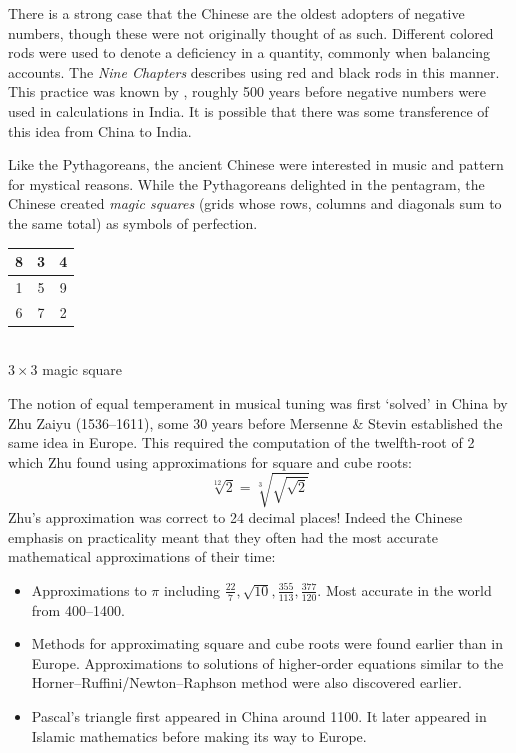 
There is a strong case that the Chinese are the oldest adopters of negative numbers, though these were not originally thought of as such. Different colored rods were used to denote a deficiency in a quantity, commonly  when balancing accounts. The \emph{Nine Chapters} describes using red and black rods in this manner. This practice was known by , roughly 500 years before negative numbers were used in calculations in India. It is possible that there was some transference of this idea from China to India.
\smallskip


\begin{minipage}[t]{0.78\linewidth}\vspace{0pt}
	 Like the Pythagoreans, the ancient Chinese were interested in music and pattern for mystical reasons. While the Pythagoreans delighted in the pentagram, the Chinese created \emph{magic squares} (grids whose rows, columns and diagonals sum to the same total) as symbols of perfection.
\end{minipage}
\hfill
\begin{minipage}[t]{0.2\linewidth}\vspace{0pt}
	\centering
	\begin{tabular}{|c|c|c|}
		\hline
		8&3&4\\\hline
		1&5&9\\\hline
		6&7&2\\\hline
	\end{tabular}
	\\[5pt]
	$3\times 3$ magic square
\end{minipage}\smallbreak

The notion of equal temperament in musical tuning was first `solved' in China by Zhu Zaiyu (1536--1611), some 30 years before Mersenne \& Stevin established the same idea in Europe. This required the computation of the twelfth-root of 2 which Zhu found using approximations for square and cube roots:
\[
	\sqrt[12]{2}=\sqrt[3]{\sqrt{\sqrt 2}}
\]
Zhu's approximation was correct to 24 decimal places! Indeed the Chinese emphasis on practicality meant that they often had the most accurate mathematical approximations of their time:
\begin{itemize}
  \item Approximations to $\pi$ including $\frac{22}7,\sqrt{10},\frac{355}{113},\frac{377}{120}$. Most accurate in the world from 400--1400.
  \item Methods for approximating square and cube roots were found earlier than in Europe. Approximations to solutions of higher-order equations similar to the Horner--Ruffini/Newton--Raphson method were also discovered earlier.
  \item Pascal's triangle first appeared in China around 1100. It later appeared in Islamic mathematics before making its way to Europe.
\end{itemize}

